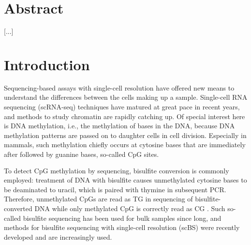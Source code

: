 \documentclass[twocolumn,10pt]{article}
\begin{document}
\setcounter{secnumdepth}{0}


\section{Abstract}

[...]

\section{Introduction}

Sequencing-based assays with single-cell resolution have offered new means to understand the differences between the cells making up a sample. Single-cell RNA sequencing (scRNA-seq) techniques have matured at great pace in recent years, and methods to study chromatin are rapidly catching up. Of special interest here is DNA methylation, i.e., the methylation of bases in the DNA, because DNA methylation patterns are passed on to daughter cells in cell division. Especially in mammals, such methylation chiefly occurs at cytosine bases that are immediately after followed by guanine bases, so-called CpG sites. 

To detect CpG methylation by sequencing, bisulfite conversion is commonly employed: treatment of DNA with bisulfite causes unmethylated cytosine bases to be deaminated to uracil, which is paired with thymine in subsequent PCR. Therefore, unmethylated CpGs are read as TG in sequencing of bisulfite-converted DNA while only methylated CpG is correctly read as CG \citep{Frommer_1992}. Such so-called bisulfite sequencing has been used for bulk samples since long, and methods for bisulfite sequencing with single-cell resolution (scBS) were recently developed \citep{Smallwood_2014} and are increasingly used.
\end{document}
